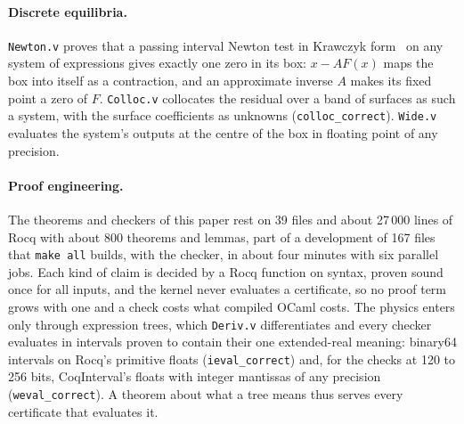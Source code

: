 \documentclass[11pt]{article}
\newcommand{\code}[1]{\texttt{#1}}
\begin{document}
\paragraph{Discrete equilibria.}
\code{Newton.v} proves that a passing interval Newton test in Krawczyk
form~\cite{krawczyk1969,moore2009} on any system of expressions gives exactly one
zero in its box: $x-AF(x)$ maps the box into itself as a contraction, and an
approximate inverse $A$ makes its fixed point a zero of $F$. \code{Colloc.v}
collocates the residual over a band of surfaces as such a system, with the
surface coefficients as unknowns (\code{colloc\_correct}). \code{Wide.v}
evaluates the system's outputs at the centre of the box in floating point of
any precision.

\paragraph{Proof engineering.}
The theorems and checkers of this paper rest on 39 files and about 27\,000 lines
of Rocq with about 800 theorems and lemmas, part of a development of 167 files
that \code{make all} builds, with the checker, in about four minutes with six
parallel jobs. Each kind of claim is decided by a Rocq
function on syntax, proven sound once for all inputs, and the kernel never
evaluates a certificate, so no proof term grows with one and a check costs what
compiled OCaml costs. The physics enters only through expression trees, which
\code{Deriv.v} differentiates and every checker evaluates in intervals proven to
contain their one extended-real meaning: binary64 intervals on Rocq's primitive
floats (\code{ieval\_correct}) and, for the checks at 120 to 256 bits,
CoqInterval's floats with integer mantissas of any precision
(\code{weval\_correct}). A theorem about what a tree means thus serves every
certificate that evaluates it.
\end{document}
